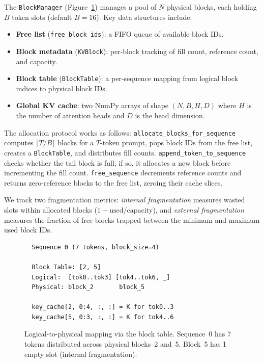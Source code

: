 \documentclass{article}
\begin{document}
The \texttt{BlockManager} (Figure~\ref{fig:architecture}) manages a pool of $N$ physical blocks, each holding $B$ token slots (default $B=16$).
Key data structures include:

\begin{itemize}
    \item \textbf{Free list} (\texttt{free\_block\_ids}): a FIFO queue of available block IDs.
    \item \textbf{Block metadata} (\texttt{KVBlock}): per-block tracking of fill count, reference count, and capacity.
    \item \textbf{Block table} (\texttt{BlockTable}): a per-sequence mapping from logical block indices to physical block IDs.
    \item \textbf{Global KV cache}: two NumPy arrays of shape $(N, B, H, D)$ where $H$ is the number of attention heads and $D$ is the head dimension.
\end{itemize}

The allocation protocol works as follows:
\texttt{allocate\_blocks\_for\_sequence} computes $\lceil T/B \rceil$ blocks for a $T$-token prompt, pops block IDs from the free list, creates a \texttt{BlockTable}, and distributes fill counts.
\texttt{append\_token\_to\_sequence} checks whether the tail block is full; if so, it allocates a new block before incrementing the fill count.
\texttt{free\_sequence} decrements reference counts and returns zero-reference blocks to the free list, zeroing their cache slices.

We track two fragmentation metrics: \emph{internal fragmentation} measures wasted slots within allocated blocks ($1 - \text{used}/\text{capacity}$), and \emph{external fragmentation} measures the fraction of free blocks trapped between the minimum and maximum used block IDs.

\begin{figure}[t]
\centering
\small
\begin{verbatim}
  Sequence 0 (7 tokens, block_size=4)
  
  Block Table: [2, 5]
  Logical:  [tok0..tok3] [tok4..tok6, _]
  Physical: block_2       block_5
  
  key_cache[2, 0:4, :, :] = K for tok0..3
  key_cache[5, 0:3, :, :] = K for tok4..6
\end{verbatim}
\caption{Logical-to-physical mapping via the block table. Sequence~0 has 7 tokens distributed across physical blocks~2 and~5. Block~5 has 1 empty slot (internal fragmentation).}
\label{fig:architecture}
\end{figure}
\end{document}
